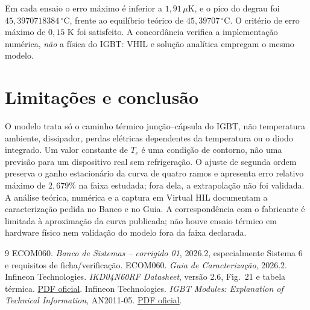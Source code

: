 \documentclass[11pt,a4paper]{article}
\begin{document}
\begin{center}\end{center}
Em cada ensaio o erro máximo é inferior a $1{,}91\,\mu$K, e o pico do
degrau foi $45{,}3970718384\,^\circ$C, frente ao equilíbrio teórico de
$45{,}39707\,^\circ$C. O critério de erro máximo de $0{,}15$ K foi
satisfeito. A concordância verifica a implementação numérica,
\emph{não} a física do IGBT: VHIL e solução analítica empregam o
mesmo modelo.

\section{Limitações e conclusão}
O modelo trata só o caminho térmico junção--cápsula do IGBT, não
temperatura ambiente, dissipador, perdas elétricas dependentes da
temperatura ou o diodo integrado. Um valor constante de $T_c$ é uma
condição de contorno, não uma previsão para um dispositivo real sem
refrigeração. O ajuste de segunda ordem preserva o ganho estacionário
da curva de quatro ramos e apresenta erro relativo máximo de $2{,}679\%$
na faixa estudada; fora dela, a extrapolação não foi validada. A análise
teórica, numérica e a captura em Virtual HIL documentam a caracterização
pedida no Banco e no Guia. A correspondência com o fabricante é limitada
à aproximação da curva publicada; não houve ensaio térmico em hardware
físico nem validação do modelo fora da faixa declarada.

\begin{thebibliography}{9}
 ECOM060. \emph{Banco de Sistemas -- corrigido 01}, 2026.2,
especialmente Sistema 6 e requisitos de ficha/verificação.
 ECOM060. \emph{Guia de Caracterização}, 2026.2.
 Infineon Technologies. \emph{IKD04N60RF Datasheet},
versão 2.6, Fig.~21 e tabela térmica.
\href{https://www.infineon.com/dgdl/Infineon-IKD04N60RF-DS-v02_06-EN.pdf?fileId=db3a30433c5c92fb013c5d6c806d00dc}{PDF oficial}.
 Infineon Technologies. \emph{IGBT Modules: Explanation of
Technical Information}, AN2011-05.
\href{https://www.infineon.com/dgdl/Infineon-AN2011_05_IGBT_Modules_Explanation-ApplicationNotes-v01_02-EN.pdf?fileId=db3a304334c41e910134eb12584604e2}{PDF oficial}.
\end{thebibliography}
\end{document}
